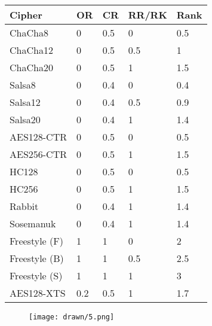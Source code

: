 \begin{table}[]
   \begin{tabular}{@{}lllll@{}}
   \toprule
   \textbf{Cipher} & \textbf{OR} & \textbf{CR} & \textbf{RR/RK} & \textbf{Rank} \\ \midrule
   ChaCha8         & 0           & 0.5         & 0              & 0.5           \\
   ChaCha12        & 0           & 0.5         & 0.5            & 1             \\
   ChaCha20        & 0           & 0.5         & 1              & 1.5           \\
   Salsa8          & 0           & 0.4         & 0              & 0.4           \\
   Salsa12         & 0           & 0.4         & 0.5            & 0.9           \\
   Salsa20         & 0           & 0.4         & 1              & 1.4           \\
   AES128-CTR      & 0           & 0.5         & 0              & 0.5           \\
   AES256-CTR      & 0           & 0.5         & 1              & 1.5           \\
   HC128           & 0           & 0.5         & 0              & 0.5           \\
   HC256           & 0           & 0.5         & 1              & 1.5           \\
   Rabbit          & 0           & 0.4         & 1              & 1.4           \\
   Sosemanuk       & 0           & 0.4         & 1              & 1.4           \\
   Freestyle (F)   & 1           & 1           & 0              & 2             \\
   Freestyle (B)   & 1           & 1           & 0.5            & 2.5           \\
   Freestyle (S)   & 1           & 1           & 1              & 3             \\
   AES128-XTS      & 0.2         & 0.5         & 1              & 1.7
   \end{tabular}
   \caption{}
   \label{tbl:security-quant}
\end{table}

\begin{figure}[ht]
 \centering
  \texttt{[image: drawn/5.png]}
   \caption{}\label{fig:energy-latency-linearity}
\end{figure}


